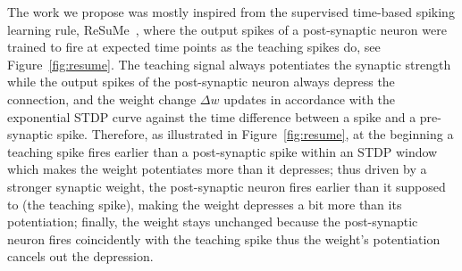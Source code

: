 The work we propose was mostly inspired from the supervised time-based spiking learning rule, ReSuMe~\cite{ponulak2010supervised}, where the output spikes of a post-synaptic neuron were trained to fire at expected time points as the teaching spikes do, see Figure~\ref{fig:resume}.
The teaching signal always potentiates the synaptic strength while the output spikes of the post-synaptic neuron always depress the connection, and the weight change $\Delta w$ updates in accordance with the exponential STDP curve against the time difference between a spike and a pre-synaptic spike.
Therefore, as illustrated in Figure~\ref{fig:resume}, at the beginning a teaching spike fires earlier than a post-synaptic spike within an STDP window which makes the weight potentiates more than it depresses;
thus driven by a stronger synaptic weight, the post-synaptic neuron fires earlier than it supposed to (the teaching spike), making the weight depresses a bit more than its potentiation;
finally, the weight stays unchanged because the post-synaptic neuron fires coincidently with the teaching spike thus the weight's potentiation cancels out the depression.
